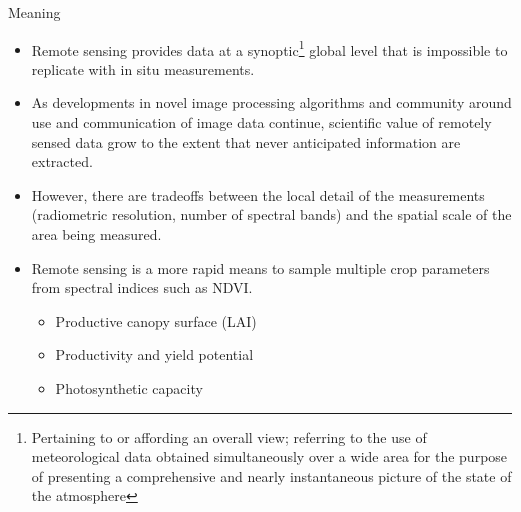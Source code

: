 \documentclass[10pt,dvipsnames,ignorenonframetext,aspectratio=169]{beamer}
\providecommand{\tightlist}{%
  \setlength{\itemsep}{0pt}\setlength{\parskip}{0pt}}
\begin{document}
\begin{frame}{Meaning}
\protect\hypertarget{meaning}{}
\begin{itemize}
\tightlist
\item
  Remote sensing provides data at a
  synoptic\footnote[frame]{Pertaining to or affording an overall view; referring to the use of meteorological data obtained simultaneously over a wide area for the purpose of presenting a comprehensive and nearly instantaneous picture of the state of the atmosphere}
  global level that is impossible to replicate with in situ
  measurements.
\item
  As developments in novel image processing algorithms and community
  around use and communication of image data continue, scientific value
  of remotely sensed data grow to the extent that never anticipated
  information are extracted.
\item
  However, there are tradeoffs between the local detail of the
  measurements (radiometric resolution, number of spectral bands) and
  the spatial scale of the area being measured.
\item
  Remote sensing is a more rapid means to sample multiple crop
  parameters from spectral indices such as NDVI.

  \begin{itemize}
  \tightlist
  \item
    Productive canopy surface (LAI)
  \item
    Productivity and yield potential
  \item
    Photosynthetic capacity
  \end{itemize}
\end{itemize}
\end{frame}
\end{document}
